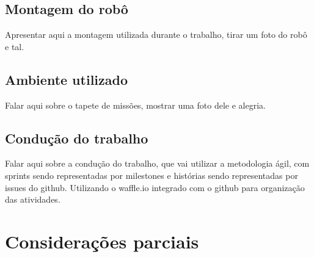 	\subsection{Montagem do robô} %
	\label{sub:montagem_do_robô}
		Apresentar aqui a montagem utilizada durante o trabalho, tirar um foto do robô e tal.

	\subsection{Ambiente utilizado} %
	\label{sub:ambiente_utilizado}
		Falar aqui sobre o tapete de missões, mostrar uma foto dele e alegria.

	\subsection{Condução do trabalho} %
	\label{sub:condução_do_trabalho}
		Falar aqui sobre a condução do trabalho, que vai utilizar a metodologia ágil, com sprints sendo representadas por milestones e histórias sendo representadas por issues do github. Utilizando o waffle.io integrado com o github para organização das atividades.

	

\section{Considerações parciais} %
\label{sec:considerações_parciais}

